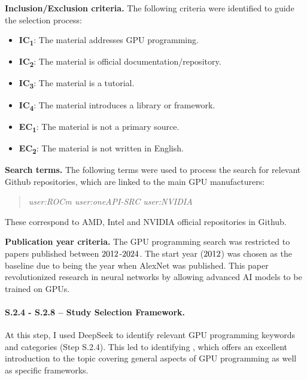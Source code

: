 

\textbf{Inclusion/Exclusion criteria.}
The following criteria were identified to guide the selection process:

\begin{itemize}
	\item \textbf{IC\textsubscript{1}}: The material addresses GPU programming.
	\item \textbf{IC\textsubscript{2}}: The material is official documentation/repository.
	\item \textbf{IC\textsubscript{3}}: The material is a tutorial.
	\item \textbf{IC\textsubscript{4}}: The material introduces a library or framework. \\
	\item \textbf{EC\textsubscript{1}}: The material is not a primary source.
	\item \textbf{EC\textsubscript{2}}: The material is not written in English.
\end{itemize}

\textbf{Search terms.}
The following terms were used to process the search for relevant Github repositories, which are
linked to the main GPU manufacturers:

\begin{quote}
	\textit{user:ROCm user:oneAPI-SRC user:NVIDIA}
\end{quote}

These correspond to AMD, Intel and NVIDIA official repositories in Github.

\textbf{Publication year criteria.}
The GPU programming search was restricted to papers published between
$2012$-$2024$. The start year ($2012$) was chosen as the baseline due
to being the year when AlexNet \cite{krizhevsky_imagenet_2012} was published. This paper
revolutionized research in neural networks by allowing advanced AI models to be trained on GPUs.

\paragraph{S.2.4 - S.2.8 -- Study Selection Framework.}
\label{sec:ai-screening}
At this step, I used DeepSeek \cite{noauthor_deepseek_nodate} to identify relevant GPU programming
keywords and categories (Step S.2.4). This led to identifying \cite{noauthor_enccsgpu-programming_nodate}, which
offers an excellent introduction to the topic covering general aspects of GPU programming as well
as specific frameworks.

